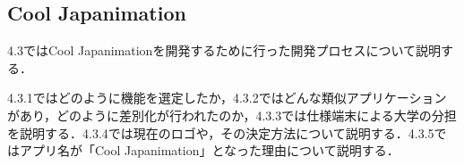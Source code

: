 \subsection{Cool Japanimation}
\par
4.3ではCool Japanimationを開発するために行った開発プロセスについて説明する．
\par
4.3.1ではどのように機能を選定したか，4.3.2ではどんな類似アプリケーションがあり，どのように差別化が行われたのか，4.3.3では仕様端末による大学の分担を説明する．4.3.4では現在のロゴや，その決定方法について説明する．4.3.5ではアプリ名が「Cool Japanimation」となった理由について説明する．
